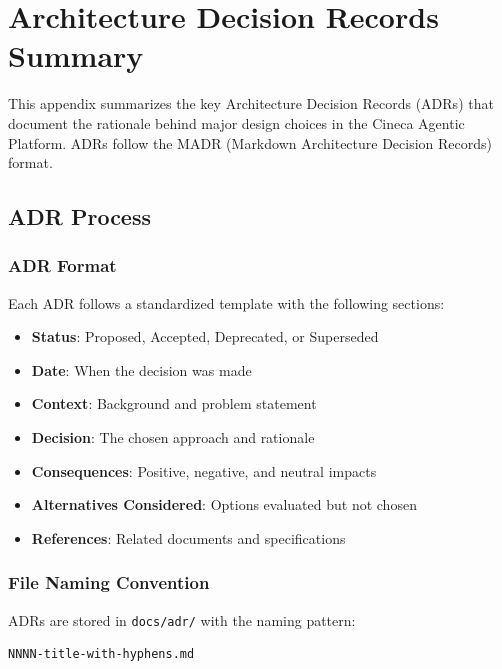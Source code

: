 
\chapter{Architecture Decision Records Summary}
\label{app:adr-summary}

This appendix summarizes the key Architecture Decision Records (ADRs) that document the rationale behind major design choices in the Cineca Agentic Platform. ADRs follow the MADR (Markdown Architecture Decision Records) format.

\section{ADR Process}
\label{app:adr:process}

\subsection{ADR Format}

Each ADR follows a standardized template with the following sections:

\begin{itemize}
    \item \textbf{Status}: Proposed, Accepted, Deprecated, or Superseded
    \item \textbf{Date}: When the decision was made
    \item \textbf{Context}: Background and problem statement
    \item \textbf{Decision}: The chosen approach and rationale
    \item \textbf{Consequences}: Positive, negative, and neutral impacts
    \item \textbf{Alternatives Considered}: Options evaluated but not chosen
    \item \textbf{References}: Related documents and specifications
\end{itemize}

\subsection{File Naming Convention}

ADRs are stored in \texttt{docs/adr/} with the naming pattern:
\begin{verbatim}
NNNN-title-with-hyphens.md
\end{verbatim}

